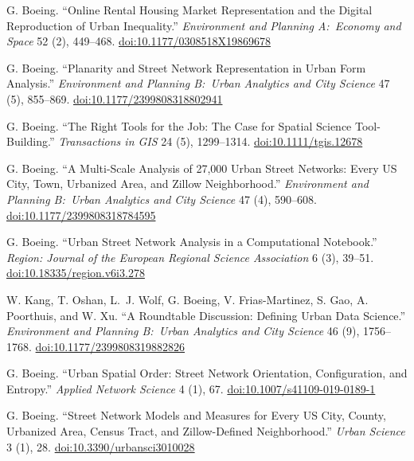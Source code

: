 \documentclass[11pt,letterpaper]{report} %
\begin{document}
\begin{tablist}
\item[2020] \tab{}G. Boeing. \enquote{Online Rental Housing Market Representation and the Digital Reproduction of Urban Inequality.} \textit{Environment and Planning A:\ Economy and Space} 52 (2), 449--468. \href{https://doi.org/10.1177/0308518X19869678}{doi:10.1177/0308518X19869678}

\item[2020] \tab{}G. Boeing. \enquote{Planarity and Street Network Representation in Urban Form Analysis.} \textit{Environment and Planning B:\ Urban Analytics and City Science} 47 (5), 855--869. \href{https://doi.org/10.1177/2399808318802941}{doi:10.1177/2399808318802941}

\item[2020] \tab{}G. Boeing. \enquote{The Right Tools for the Job: The Case for Spatial Science Tool-Building.} \textit{Transactions in GIS} 24 (5), 1299--1314. \href{https://doi.org/10.1111/tgis.12678}{doi:10.1111/tgis.12678}

\item[2020] \tab{}G. Boeing. \enquote{A Multi-Scale Analysis of 27,000 Urban Street Networks: Every US City, Town, Urbanized Area, and Zillow Neighborhood.} \textit{Environment and Planning B:\ Urban Analytics and City Science} 47 (4), 590--608. \href{https://doi.org/10.1177/2399808318784595}{doi:10.1177/2399808318784595}

\item[2020] \tab{}G. Boeing. \enquote{Urban Street Network Analysis in a Computational Notebook.} \textit{Region: Journal of the European Regional Science Association} 6 (3), 39--51. \href{https://doi.org/10.18335/region.v6i3.278}{doi:10.18335/region.v6i3.278}

\item[2019] \tab{}W. Kang, T. Oshan, L.~J. Wolf, G. Boeing, V. Frias-Martinez, S. Gao, A. Poorthuis, and W. Xu. \enquote{A Roundtable Discussion: Defining Urban Data Science.} \textit{Environment and Planning B:\ Urban Analytics and City Science} 46 (9), 1756--1768. \href{https://doi.org/10.1177/2399808319882826}{doi:10.1177/2399808319882826}

\item[2019] \tab{}G. Boeing. \enquote{Urban Spatial Order: Street Network Orientation, Configuration, and Entropy.} \textit{Applied Network Science} 4 (1), 67. \href{https://doi.org/10.1007/s41109-019-0189-1}{doi:10.1007/s41109-019-0189-1}

\item[2019] \tab{}G. Boeing. \enquote{Street Network Models and Measures for Every US City, County, Urbanized Area, Census Tract, and Zillow-Defined Neighborhood.} \textit{Urban Science} 3 (1), 28. \href{https://doi.org/10.3390/urbansci3010028}{doi:10.3390/urbansci3010028}


\end{tablist}
\end{document}

